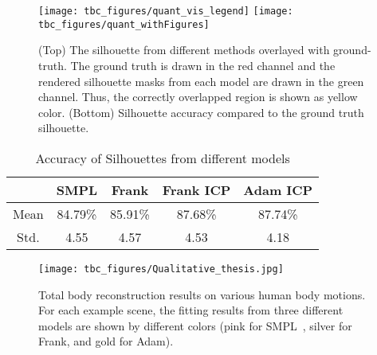 
\begin{figure}[t]	
    \centering
	\texttt{[image: tbc\_figures/quant\_vis\_legend]}
	\texttt{[image: tbc\_figures/quant\_withFigures]}
	\caption{(Top) The silhouette from different methods overlayed with ground-truth. The ground truth is drawn in the red channel and the rendered silhouette masks from each model are drawn in the green channel. Thus, the correctly overlapped region is shown as yellow color. (Bottom) Silhouette accuracy compared to the ground truth silhouette.}
	\label{fig:quant_silhoutte_vis}
\end{figure}

\begin{table} [t]	
\centering
\scriptsize
	\caption{Accuracy of Silhouettes from different models}\label{Table:quant_silhoette}
	\begin{tabular}{c|c|c|c|c}
		\hline 
		& {SMPL\cite{Loper2015}} & {Frank} & {Frank ICP} & {Adam ICP} \tabularnewline
		\hline 
		Mean &  84.79\% & 85.91\% & 87.68\% & 87.74\%  \tabularnewline
		\hline 
		Std.  &  4.55  & 4.57 & 4.53  & 4.18  \tabularnewline
		\hline 
	\end{tabular} 
	\label{table:quant_sillouette}
\end{table}



\begin{figure*}[t]
	\texttt{[image: tbc\_figures/Qualitative\_thesis.jpg]}
	\caption{Total body reconstruction results on various human body motions. For each example scene, the fitting results from three different models are shown by different colors (pink for SMPL~\cite{Loper2015}, silver for Frank, and gold for Adam). 
	}
	\label{fig:qualitativeResults}
\end{figure*}
%

